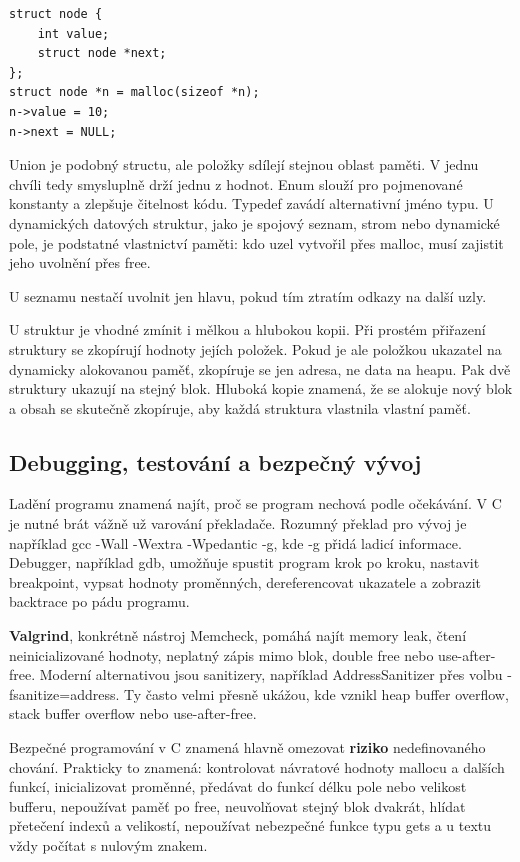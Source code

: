 \documentclass[11pt,a4paper]{article}
\begin{document}
\begin{codebox}
\small
\begin{verbatim}
struct node {
    int value;
    struct node *next;
};
struct node *n = malloc(sizeof *n);
n->value = 10;
n->next = NULL;
\end{verbatim}
\end{codebox}

Union je podobný structu, ale položky sdílejí stejnou oblast paměti. V jednu chvíli tedy smysluplně drží jednu z hodnot. Enum slouží pro pojmenované konstanty a zlepšuje čitelnost kódu. Typedef zavádí alternativní jméno typu. U dynamických datových struktur, jako je spojový seznam, strom nebo dynamické pole, je podstatné vlastnictví paměti: kdo uzel vytvořil přes malloc, musí zajistit jeho uvolnění přes free.

U seznamu nestačí uvolnit jen hlavu, pokud tím ztratím odkazy na další uzly.

U struktur je vhodné zmínit i mělkou a hlubokou kopii. Při prostém přiřazení struktury se zkopírují hodnoty jejích položek. Pokud je ale položkou ukazatel na dynamicky alokovanou paměť, zkopíruje se jen adresa, ne data na heapu. Pak dvě struktury ukazují na stejný blok. Hluboká kopie znamená, že se alokuje nový blok a obsah se skutečně zkopíruje, aby každá struktura vlastnila vlastní paměť.

\subsection*{Debugging, testování a bezpečný vývoj}

Ladění programu znamená najít, proč se program nechová podle očekávání. V C je nutné brát vážně už varování překladače. Rozumný překlad pro vývoj je například gcc -Wall -Wextra -Wpedantic -g, kde -g přidá ladicí informace. Debugger, například gdb, umožňuje spustit program krok po kroku, nastavit breakpoint, vypsat hodnoty proměnných, dereferencovat ukazatele a zobrazit backtrace po pádu programu.

\textbf{Valgrind}, konkrétně nástroj Memcheck, pomáhá najít memory leak, čtení neinicializované hodnoty, neplatný zápis mimo blok, double free nebo use-after-free. Moderní alternativou jsou sanitizery, například AddressSanitizer přes volbu -fsanitize=address. Ty často velmi přesně ukážou, kde vznikl heap buffer overflow, stack buffer overflow nebo use-after-free.

Bezpečné programování v C znamená hlavně omezovat \textbf{riziko} nedefinovaného chování. Prakticky to znamená: kontrolovat návratové hodnoty mallocu a dalších funkcí, inicializovat proměnné, předávat do funkcí délku pole nebo velikost bufferu, nepoužívat paměť po free, neuvolňovat stejný blok dvakrát, hlídat přetečení indexů a velikostí, nepoužívat nebezpečné funkce typu gets a u textu vždy počítat s nulovým znakem.
\end{document}
